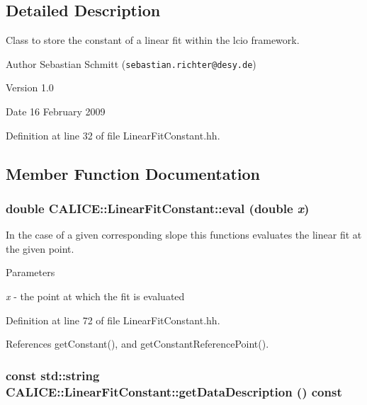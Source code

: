 \subsection{Detailed Description}
Class to store the constant of a linear fit within the lcio framework. \begin{DoxyAuthor}{Author}
Sebastian Schmitt ({\tt sebastian.richter@desy.de}) 
\end{DoxyAuthor}
\begin{DoxyVersion}{Version}
1.0 
\end{DoxyVersion}
\begin{DoxyDate}{Date}
16 February 2009 
\end{DoxyDate}


Definition at line 32 of file LinearFitConstant.hh.

\subsection{Member Function Documentation}
\subsubsection[{eval}]{\setlength{\rightskip}{0pt plus 5cm}double CALICE::LinearFitConstant::eval (double {\em x})\hspace{0.3cm}{\ttfamily  [inline]}}\label{classCALICE_1_1LinearFitConstant_a24c9412dcfa0de7b06a4083610afb68f}


In the case of a given corresponding slope this functions evaluates the linear fit at the given point. 
\begin{DoxyParams}{Parameters}
\item[{\em x}]-\/ the point at which the fit is evaluated \end{DoxyParams}


Definition at line 72 of file LinearFitConstant.hh.

References getConstant(), and getConstantReferencePoint().
\subsubsection[{getDataDescription}]{\setlength{\rightskip}{0pt plus 5cm}const std::string CALICE::LinearFitConstant::getDataDescription () const\hspace{0.3cm}{\ttfamily  [inline]}}\label{classCALICE_1_1LinearFitConstant_ae2b2c8efbda731c2968ecc5ca4da5772}



